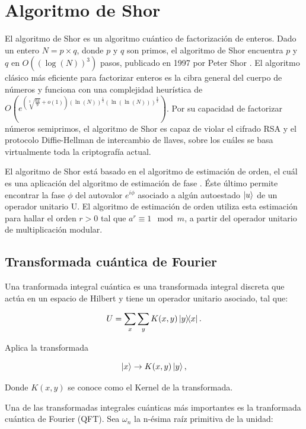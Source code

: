 \chapter{Algoritmo de Shor}

El algoritmo de Shor es un algoritmo cuántico de factorización de enteros. Dado un entero $N=p \times q$, donde $p$ y $q$ son primos, el algoritmo de Shor encuentra $p$ y $q$ en $O((\log(N))^3)$ pasos, publicado en 1997 por Peter Shor \cite{Shor_1999}. El algoritmo clásico más eficiente para factorizar enteros es la cibra general del cuerpo de números y funciona con una complejidad heurística de $O(e^{(\sqrt[3]{\frac{64}{9}}+o(1))(\ln(N))^{\frac{1}{3}}(\ln(\ln(N)))^{\frac{2}{3}}})$. Por su capacidad de factorizar números semiprimos, el algoritmo de Shor es capaz de violar el cifrado RSA \cite{Bernstein_2017, Grosshans_2015} y el protocolo Diffie-Hellman de intercambio de llaves, sobre los cuáles se basa virtualmente toda la criptografía actual.

El algoritmo de Shor está basado en el algoritmo de estimación de orden, el cuál es una aplicación del algoritmo de estimación de fase \cite{Nielsen_2009}. Éste último permite encontrar la fase $\phi$ del autovalor $e^{i \phi}$ asociado a algún autoestado $\ket{u}$ de un operador unitario U. El algoritmo de estimación de orden utiliza esta estimación para hallar el orden $r>0$ tal que $a^r \equiv 1 \mod m$, a partir del operador unitario de multiplicación modular.

\section{Transformada cuántica de Fourier}

Una tranformada integral cuántica es una transformada integral discreta que actúa en un espacio de Hilbert y tiene un operador unitario asociado, tal que:

\begin{equation}
    U = \sum\limits_x\sum\limits_y K(x,y) \ketbra{y}{x} .
\end{equation}

Aplica la transformada

\begin{equation}
    \ket{x} \rightarrow K(x,y) \ket{y} ,
\end{equation}

Donde $K(x,y)$ se conoce como el Kernel de la transformada.

Una de las transformadas integrales cuánticas más importantes es la tranformada cuántica de Fourier (QFT). Sea $\omega_n$ la n-ésima raíz primitiva de la unidad:

